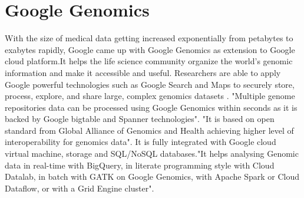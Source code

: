 \section{Google Genomics}

With the size of medical data getting increased exponentially from petabytes to exabytes rapidly, Google came up with Google Genomics 
as extension to Google cloud platform.It helps the life science community organize the world’s genomic information and make it 
accessible and useful\cite{www-genomics}. Researchers are able to apply Google powerful technologies such as Google Search and 
Maps to securely store, process, explore, and share large, complex genomics datasets \cite{www-genomics}.
"Multiple genome repositories data can be processed using Google Genomics within seconds as it is backed by Google bigtable and 
Spanner technologies"\cite{www-genomics}. "It is based on open standard from Global Alliance of Genomics and Health achieving higher 
level of interoperability for genomics data"\cite{www-genomics}. It is fully integrated with Google cloud virtual machine, storage 
and SQL/NoSQL databases\cite{www-genomics}."It helps analysing Genomic data in real-time with BigQuery, in literate programming style 
with Cloud Datalab, in batch with GATK on Google Genomics, with Apache Spark or Cloud Dataflow, or with a Grid Engine 
cluster"\cite{www-genomics}.
